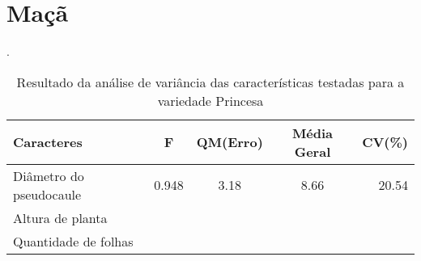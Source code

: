 \section{Maçã}
\begin{table}[!htb]
	\begin{center}
		\caption{Resultado da análise de variância das características testadas para a variedade Princesa}.
		\begin{tabular*}{\textwidth}{@{\extracolsep{\fill}}lcccr}
			\toprule
			\toprule
			\textbf{Caracteres} & \textbf{F}  & \textbf{QM(Erro)} & \textbf{Média Geral} &\textbf {CV(\%)} \\
			\hline
			Diâmetro do pseudocaule & 0.948 & 3.18 & 8.66 & 20.54\\ 
			Altura de planta 		&&&&\\
			Quantidade de folhas 	&&&&\\
			\hline
			\hline
		\end{tabular*}
	\end{center}
\end{table}
